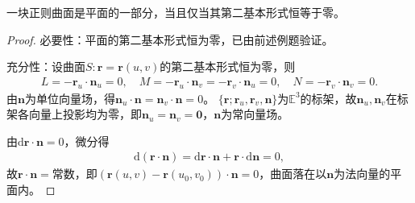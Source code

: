 \documentclass[../../main.tex]{subfiles}%
\begin{document}
\begin{theorem}
一块正则曲面是平面的一部分，当且仅当其第二基本形式恒等于零。
\end{theorem}
\begin{proof}

必要性：平面的第二基本形式恒为零，已由前述例题验证。

充分性：设曲面$S:\boldsymbol{r}=\boldsymbol{r}(u,v)$的第二基本形式恒为零，则
\begin{align*}
L=-\boldsymbol{r}_u\cdot\boldsymbol{n}_u=0,\quad M=-\boldsymbol{r}_u\cdot\boldsymbol{n}_v=-\boldsymbol{r}_v\cdot\boldsymbol{n}_u=0,\quad N=-\boldsymbol{r}_v\cdot\boldsymbol{n}_v=0.
\end{align*}
由$\boldsymbol{n}$为单位向量场，得$\boldsymbol{n}_u\cdot\boldsymbol{n}=\boldsymbol{n}_v\cdot\boldsymbol{n}=0$。
$\{\boldsymbol{r};\boldsymbol{r}_u,\boldsymbol{r}_v,\boldsymbol{n}\}$为$\mathbb{E}^3$的标架，故$\boldsymbol{n}_u,\boldsymbol{n}_v$在标架各向量上投影均为零，即$\boldsymbol{n}_u=\boldsymbol{n}_v=\boldsymbol{0}$，$\boldsymbol{n}$为常向量场。

由$\mathrm{d}\boldsymbol{r}\cdot\boldsymbol{n}=0$，微分得
\begin{align*}
\mathrm{d}(\boldsymbol{r}\cdot\boldsymbol{n})=\mathrm{d}\boldsymbol{r}\cdot\boldsymbol{n}+\boldsymbol{r}\cdot\mathrm{d}\boldsymbol{n}=0,
\end{align*}
故$\boldsymbol{r}\cdot\boldsymbol{n}=$常数，即$(\boldsymbol{r}(u,v)-\boldsymbol{r}(u_0,v_0))\cdot\boldsymbol{n}=0$，曲面落在以$\boldsymbol{n}$为法向量的平面内。

\end{proof}
\end{document}
